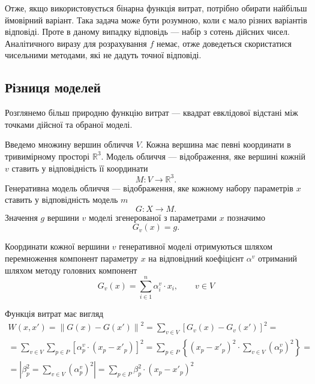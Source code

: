 Отже, якщо використовується бінарна функція витрат,
потрібно обирати найбільш ймовірний варіант.
Така задача може бути розумною, коли є мало різних варіантів відповіді.
Проте в даному випадку відповідь --- набір з сотень дійсних чисел.
Аналітичного виразу для розрахування $f$ немає,
отже доведеться скористатися чисельними методами,
які не дадуть точної відповіді.

\subsection{Різниця моделей}

Розглянемо більш природню функцію витрат ---
квадрат евклідової відстані між точками дійсної та обраної моделі.

Введемо множину вершин обличчя $V$.
Кожна вершина має певні координати в тривимірному просторі $\mathbb{R}^3$.
Модель обличчя --- відображення,
яке вершині кожній $v$ ставить у відповідність її координати
\begin{equation*}
  M: V \rightarrow \mathbb{R}^3.
\end{equation*}
Генеративна модель обличчя --- відображення,
яке кожному набору параметрів $x$ ставить у відповідність модель $m$
\begin{equation*}
  G: X \rightarrow M.
\end{equation*}
Значення $g$ вершини $v$ моделі згенерованої з параметрами $x$ позначимо
\begin{equation*}
  G_v\left( x \right) = g.
\end{equation*}

Координати кожної вершини $v$ генеративної моделі отримуються шляхом
перемноження компонент параметру $x$ на відповідний коефіцієнт $\alpha^v$
отриманий шляхом методу головних компонент
\begin{equation*}
  G_v\left( x \right) = \sum_{i \in 1}^n \alpha_i^v \cdot x_i,
  \qquad v \in V
\end{equation*}

Функція витрат має вигляд
\begin{equation*}
  \begin{split}
    W \left( x, x' \right)
    = \left\| G\left( x \right) - G\left( x' \right) \right\|^2
    = \sum_{v \in V} \left[
        G_v\left( x \right) - G_v\left( x' \right)
      \right]^2 = \\
    = \sum_{v \in V} \sum_{p \in P} \left[
        \alpha_p^v \cdot \left( x_p - x'_p \right)
      \right]^2
    = \sum_{p \in P} \left\{ \left( x_p - x'_p \right)^2
      \cdot \sum_{v \in V} \left( \alpha_p^v \right)^2 \right\} = \\
    = \left| \beta_p^2 = \sum_{v \in V} \left( \alpha_p^v \right)^2 \right|
    = \sum_{p \in P} \beta_p^2 \cdot \left( x_p - x'_p \right)^2
  \end{split}
\end{equation*}

